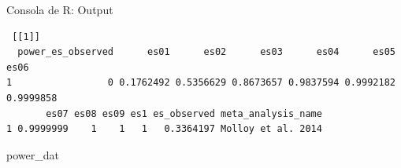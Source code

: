 \documentclass[
  bookmarksnumbered]{article}
\newenvironment{Shaded}{\begin{snugshade}}{\end{snugshade}}
\newcommand{\NormalTok}[1]{\textcolor[rgb]{0.12,0.11,0.11}{#1}}
\begin{document}
\begin{ROut}{Consola de R: Output~\thetcbcounter}
                \begin{footnotesize}
                \begin{verbatim} [[1]]
  power_es_observed      es01      es02      es03      es04      es05      es06
1                 0 0.1762492 0.5356629 0.8673657 0.9837594 0.9992182 0.9999858
       es07 es08 es09 es1 es_observed meta_analysis_name
1 0.9999999    1    1   1   0.3364197 Molloy et al. 2014
 \end{verbatim}
                \end{footnotesize}
                \end{ROut}

\begin{Shaded}
\begin{Highlighting}[]
\NormalTok{power\_dat}
\end{Highlighting}
\end{Shaded}
\end{document}
